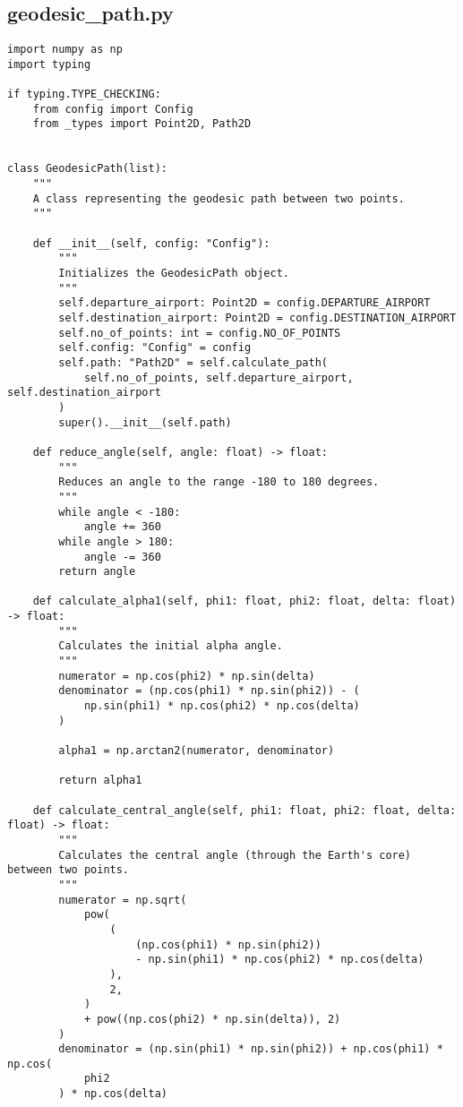 \subsection{geodesic_path.py}
\begin{verbatim}
import numpy as np
import typing

if typing.TYPE_CHECKING:
    from config import Config
    from _types import Point2D, Path2D


class GeodesicPath(list):
    """
    A class representing the geodesic path between two points.
    """

    def __init__(self, config: "Config"):
        """
        Initializes the GeodesicPath object.
        """
        self.departure_airport: Point2D = config.DEPARTURE_AIRPORT
        self.destination_airport: Point2D = config.DESTINATION_AIRPORT
        self.no_of_points: int = config.NO_OF_POINTS
        self.config: "Config" = config
        self.path: "Path2D" = self.calculate_path(
            self.no_of_points, self.departure_airport, self.destination_airport
        )
        super().__init__(self.path)

    def reduce_angle(self, angle: float) -> float:
        """
        Reduces an angle to the range -180 to 180 degrees.
        """
        while angle < -180:
            angle += 360
        while angle > 180:
            angle -= 360
        return angle

    def calculate_alpha1(self, phi1: float, phi2: float, delta: float) -> float:
        """
        Calculates the initial alpha angle.
        """
        numerator = np.cos(phi2) * np.sin(delta)
        denominator = (np.cos(phi1) * np.sin(phi2)) - (
            np.sin(phi1) * np.cos(phi2) * np.cos(delta)
        )

        alpha1 = np.arctan2(numerator, denominator)

        return alpha1

    def calculate_central_angle(self, phi1: float, phi2: float, delta: float) -> float:
        """
        Calculates the central angle (through the Earth's core) between two points.
        """
        numerator = np.sqrt(
            pow(
                (
                    (np.cos(phi1) * np.sin(phi2))
                    - np.sin(phi1) * np.cos(phi2) * np.cos(delta)
                ),
                2,
            )
            + pow((np.cos(phi2) * np.sin(delta)), 2)
        )
        denominator = (np.sin(phi1) * np.sin(phi2)) + np.cos(phi1) * np.cos(
            phi2
        ) * np.cos(delta)


\end{verbatim}
